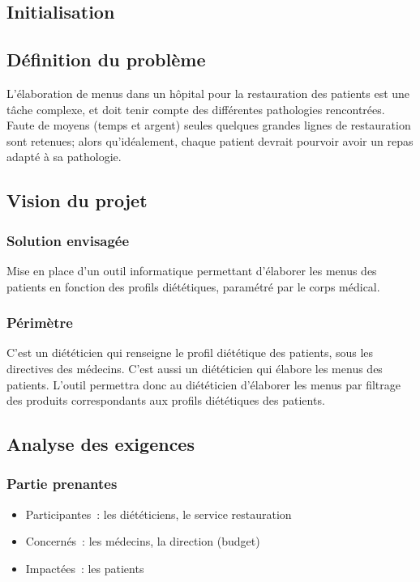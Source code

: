 \textcolor[RGB]{46, 116, 181}{\chapter{Initialisation}}
\section{Définition du problème}
L'élaboration de menus dans un hôpital pour la restauration des patients
est une tâche complexe, et doit tenir compte des différentes pathologies
rencontrées. Faute de moyens (temps et argent) seules quelques grandes
lignes de restauration sont retenues; alors qu'idéalement, chaque
patient devrait pourvoir avoir un repas adapté à sa pathologie.

\section{Vision du projet}
\subsection{Solution envisagée}
Mise en place d'un outil informatique permettant d'élaborer les menus
des patients en fonction des profils diététiques, paramétré par le corps
médical.

\subsection{Périmètre}
C'est un diététicien qui renseigne le profil diététique des patients,
sous les directives des médecins. C'est aussi un diététicien qui élabore
les menus des patients. L'outil permettra donc au diététicien d'élaborer
les menus par filtrage des produits correspondants aux profils
diététiques des patients.

\section{Analyse des exigences}
\subsection{Partie prenantes}
\begin{itemize}
\item Participantes~: les diététiciens, le service restauration
\item Concernés~: les médecins, la direction (budget)
\item Impactées~: les patients
\end{itemize}

